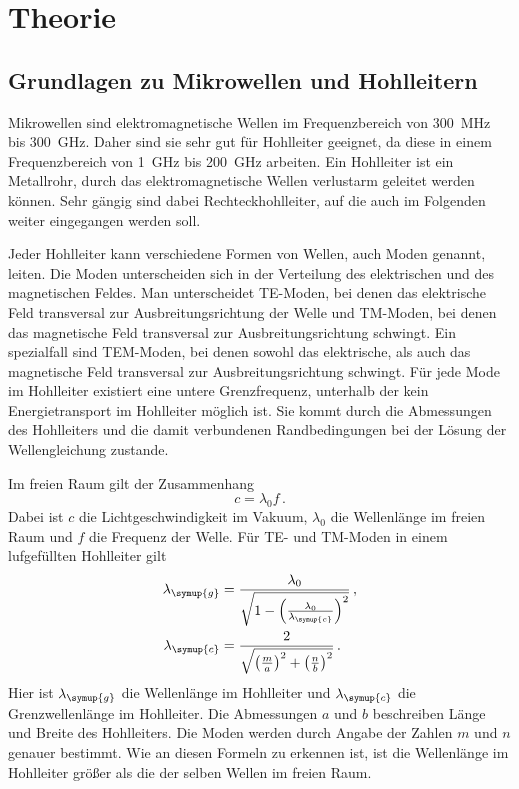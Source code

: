 \section{Theorie}
\label{sec:Theorie}

\subsection{Grundlagen zu Mikrowellen und Hohlleitern}
\label{subsec:grundlagen}
Mikrowellen sind elektromagnetische Wellen im Frequenzbereich von \SI{300}{\mega\Hz}
bis \SI{300}{\giga\Hz}. Daher sind sie sehr gut für Hohlleiter geeignet, da diese in einem
Frequenzbereich von \SI{1}{\giga\Hz} bis \SI{200}{\giga\Hz} arbeiten. Ein Hohlleiter ist
ein Metallrohr, durch das elektromagnetische Wellen verlustarm geleitet werden können.
Sehr gängig sind dabei Rechteckhohlleiter, auf die auch im Folgenden weiter eingegangen
werden soll.

Jeder Hohlleiter kann verschiedene Formen von Wellen, auch Moden genannt, leiten.
Die Moden unterscheiden sich in der Verteilung des elektrischen und des magnetischen
Feldes. Man unterscheidet TE-Moden, bei denen das elektrische Feld transversal zur
Ausbreitungsrichtung der Welle und TM-Moden, bei denen das magnetische Feld transversal
zur Ausbreitungsrichtung schwingt. Ein spezialfall sind TEM-Moden, bei denen sowohl
das elektrische, als auch das magnetische Feld transversal zur Ausbreitungsrichtung
schwingt. Für jede Mode im Hohlleiter existiert eine untere Grenzfrequenz, unterhalb
der kein Energietransport im Hohlleiter möglich ist. Sie kommt durch die Abmessungen
des Hohlleiters und die damit verbundenen Randbedingungen bei der Lösung der Wellengleichung zustande.

Im freien Raum gilt der Zusammenhang
\begin{equation}
  c= \lambda_0 f\,.
  \label{eqn:frequenz}
\end{equation}
Dabei ist $c$ die Lichtgeschwindigkeit im Vakuum, $\lambda_0$ die Wellenlänge im
freien Raum und $f$ die Frequenz der Welle.
Für TE- und TM-Moden in einem lufgefüllten Hohlleiter gilt
\begin{align}
  \lambda_{\symup{g}}&=\frac{\lambda_0}{\sqrt{1-\left(\frac{\lambda_0}
  {\lambda_{\symup{c}}}\right)^2}} \,, \label{eqn:hohlleiterg}\\
  \lambda_{\symup{c}}&=\frac{2}{\sqrt{\left(\frac{m}{a}\right)^2+
  \left(\frac{n}{b}\right)^2}} \,.
  \label{eqn:hohlleiterc}
\end{align}
Hier ist $\lambda_{\symup{g}}$ die Wellenlänge im Hohlleiter und $\lambda_{\symup{c}}$
die Grenzwellenlänge im Hohlleiter. Die Abmessungen $a$ und $b$ beschreiben Länge und Breite des Hohlleiters.
Die Moden werden durch Angabe der Zahlen $m$ und $n$ genauer bestimmt.
Wie an diesen Formeln zu erkennen ist, ist die Wellenlänge im Hohlleiter
größer als die der selben Wellen im freien Raum.

